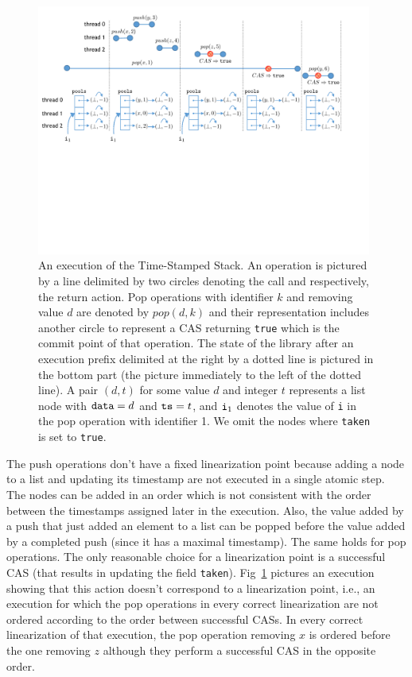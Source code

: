 \begin{figure}[t]
\centering
\includegraphics[width=11cm]{fig-timeStamp.pdf}
\vspace{-4.5mm}
\caption{An execution of the Time-Stamped Stack. An operation is pictured by a line delimited by two circles denoting the call and respectively, the return action. Pop operations with identifier $k$ and removing value $d$ are denoted by $pop(d,k)$ and their representation includes another circle to represent a CAS returning {\tt true} which is the commit point of that operation. The state of the library after an execution prefix delimited at the right by a dotted line is pictured in the bottom part (the picture immediately to the left of the dotted line). A pair $(d,t)$ for some value $d$ and integer $t$ represents a list node with ${\tt data}=d$ and ${\tt ts}=t$, and ${\tt i}_1$ denotes the value of {\tt i} in the pop operation with identifier 1. We omit the nodes where {\tt taken} is set to {\tt true}.}
\label{fig:commit}
\vspace{-7mm}
\end{figure}


The push operations don't have a fixed linearization point because adding a node to a list and updating its timestamp are not executed in a single atomic step. The nodes can be added in an order which is not consistent with the order between the timestamps assigned later in the execution. Also, the value added by a push that just added an element to a list can be popped before the value added by a completed push (since it has a maximal timestamp). The same holds for pop operations. The only reasonable choice for a linearization point is a successful CAS (that results in updating the field {\tt taken}). Fig~\ref{fig:commit} pictures an execution showing that this action doesn't correspond to a linearization point, i.e., an execution for which the pop operations in every correct linearization are not ordered according to the order between successful CASs. In every correct linearization of that execution, the pop operation removing $x$ is ordered before the one removing $z$ although they perform a successful CAS in the opposite order.

